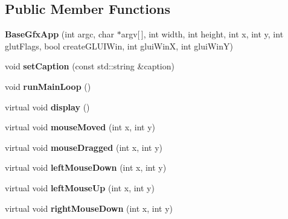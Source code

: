 \subsection*{Public Member Functions}
\begin{DoxyCompactItemize}
\item 
\hypertarget{classBaseGfxApp_a534a4b5293a35947fdae3805a103541d}{{\bfseries Base\-Gfx\-App} (int argc, char $\ast$argv\mbox{[}$\,$\mbox{]}, int width, int height, int x, int y, int glut\-Flags, bool create\-G\-L\-U\-I\-Win, int glui\-Win\-X, int glui\-Win\-Y)}\label{classBaseGfxApp_a534a4b5293a35947fdae3805a103541d}

\item 
\hypertarget{classBaseGfxApp_a4b3b1a475b7f2babaf1b477c34b15fb1}{void {\bfseries set\-Caption} (const std\-::string \&caption)}\label{classBaseGfxApp_a4b3b1a475b7f2babaf1b477c34b15fb1}

\item 
\hypertarget{classBaseGfxApp_acda031916c00d56c2dc901e2653e3083}{void {\bfseries run\-Main\-Loop} ()}\label{classBaseGfxApp_acda031916c00d56c2dc901e2653e3083}

\item 
\hypertarget{classBaseGfxApp_ac8de2d5a955582547af5619b771b4d6d}{virtual void {\bfseries display} ()}\label{classBaseGfxApp_ac8de2d5a955582547af5619b771b4d6d}

\item 
\hypertarget{classBaseGfxApp_a0956b82d7fa58b623c498aea7073dbba}{virtual void {\bfseries mouse\-Moved} (int x, int y)}\label{classBaseGfxApp_a0956b82d7fa58b623c498aea7073dbba}

\item 
\hypertarget{classBaseGfxApp_abb23f716dd6612b3a72938e41525d338}{virtual void {\bfseries mouse\-Dragged} (int x, int y)}\label{classBaseGfxApp_abb23f716dd6612b3a72938e41525d338}

\item 
\hypertarget{classBaseGfxApp_aaaccf5a5e923a9465441a5ee712424a8}{virtual void {\bfseries left\-Mouse\-Down} (int x, int y)}\label{classBaseGfxApp_aaaccf5a5e923a9465441a5ee712424a8}

\item 
\hypertarget{classBaseGfxApp_a0a2961a932b02b2f9d7d0bb408f6fb51}{virtual void {\bfseries left\-Mouse\-Up} (int x, int y)}\label{classBaseGfxApp_a0a2961a932b02b2f9d7d0bb408f6fb51}

\item 
\hypertarget{classBaseGfxApp_afa87e6a71220945e41f0424e540125d9}{virtual void {\bfseries right\-Mouse\-Down} (int x, int y)}\label{classBaseGfxApp_afa87e6a71220945e41f0424e540125d9}


\end{DoxyCompactItemize}
